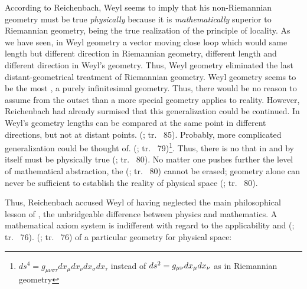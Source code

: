 \documentclass[draft]{article}
\newcommand{\rhp}[2]{(\cite[#1]{Reichenbach1920a}; tr.\ \citeyear{Reichenbach1969} #2)\xspace}
\begin{document}
According to Reichenbach, Weyl seems to imply that his non-Riemannian geometry must be true \emph{physically} because it is \emph{mathematically} superior to Riemannian geometry, being the true realization of the principle of locality. As we have seen, in Weyl geometry a vector moving close loop which would same length but different direction in Riemannian geometry, different length and different direction in Weyl's geometry. Thus, Weyl geometry eliminated the last distant-geometrical treatment of Riemannian geometry. Weyl geometry seems to be the most , a purely infinitesimal geometry. Thus, there would be no reason to assume from the outset than a more special geometry applies to reality. However, Reichenbach had already surmised that this generalization could be continued. In Weyl's geometry lengths can be compared at the same point in different directions, but not at distant points.  \rhp{76}{85}. Probably, more complicated generalization could be thought of.  \rhp{76}{79}\footnote{$d s^{4}=g_{\mu \nu \sigma \tau} d x_{\mu} d x_{\nu} d x_{\sigma} d x_{\tau}$ instead of $d s^{2}=g_{\mu\nu} d x_{\mu} d x_{\nu}$ as in Riemannian geometry}. Thus, there is no  that in and by itself must be physically true \rhp{76}{80}. No matter one pushes further the level of mathematical abstraction, the   \rhp{76}{80} cannot be erased; geometry alone can never be sufficient to establish the reality of physical space \rhp{76}{80}. 

Thus, Reichenbach accused Weyl of having neglected the main philosophical lesson of \gr, the unbridgeable difference between physics and mathematics. A mathematical axiom system is indifferent with regard to the applicability and  \rhp{73}{76}.  \rhp{73}{76} of a particular geometry for physical space:
\end{document}

